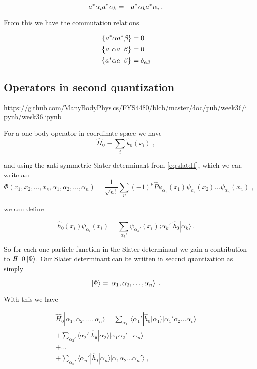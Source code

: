 $$\hc{a}{\alpha_i}\hc{a}{\alpha_k} = - \hc{a}{\alpha_k}\hc{a}{\alpha_i} \;.$$

From this we have the commutation relations

\begin{align}
    \left \{ \hc{a}{\alpha}\hc{a}{\beta} \right \} &= 0 \\
    \left \{ \op{a}{\alpha}\op{a}{\beta} \right \} &= 0 \\ 
    \left \{ \hc{a}{\alpha}\op{a}{\beta} \right \} &= \delta_{\alpha\beta}
\end{align}

\subsection{Operators in second quantization}
\url{https://github.com/ManyBodyPhysics/FYS4480/blob/master/doc/pub/week36/ipynb/week36.ipynb}

For a one-body operator in coordinate space we have
\begin{equation}
    \hat{H}_0 = \sum_i \hat{h}_0(x_i) \label{eq:2-23} \; ,
\end{equation}

and using the anti-symmetric Slater determinant from \ref{eq:slatdif}, which we can write as:
\begin{equation}
    \Phi(x_1, x_2,\dots ,x_n,\alpha_1,\alpha_2,\dots, \alpha_n)= \frac{1}{\sqrt{n!}} \sum_p (-1)^p\hat{P}\psi_{\alpha_1}(x_1)\psi_{\alpha_2}(x_2) \dots \psi_{\alpha_n}(x_n) \; ,
\end{equation}

we can define 

\begin{equation}
    \hat{h}_0(x_i) \psi_{\alpha_i}(x_i) = \sum_{\alpha_k'} \psi_{\alpha_k'}(x_i) \langle\alpha_k'|\hat{h}_0|\alpha_k\rangle \label{eq:2-25} \; .
\end{equation}

So for each one-particle function in the Slater determinant we gain a contribution to $\op{H}{0}\ket{\Phi}$. Our Slater determinant can be written in second quantization as simply

\begin{equation}
    \ket{\Phi} = \ket{\alpha_1, \alpha_2, \dots, \alpha_n} \; .
\end{equation}

With this we have

\begin{gather}
    \hat{H}_0|\alpha_1,\alpha_2,\dots, \alpha_n\rangle = \sum_{\alpha_1'}\langle \alpha_1'|\hat{h}_0|\alpha_1\rangle
    	|\alpha_1'\alpha_2 \dots \alpha_{n}\rangle \nonumber \\
     + \sum_{\alpha_2'} \langle \alpha_2'|\hat{h}_0|\alpha_2\rangle
    	|\alpha_1\alpha_2' \dots \alpha_{n}\rangle \nonumber \\
     + \dots \\
    + \sum_{\alpha_n'} \langle \alpha_n'|\hat{h}_0|\alpha_n\rangle
    	|\alpha_1\alpha_2 \dots \alpha_{n}'\rangle \label{eq:2-28} \; ,
\end{gather}

